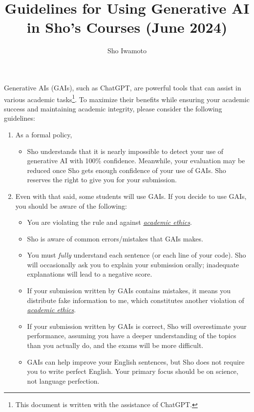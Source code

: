 \documentclass[11pt,pdfa,lastpage,minititle]{MishoNote}
\title{Guidelines for Using Generative AI in Sho's Courses (June 2024)}
\author{Sho Iwamoto}
\begin{document}
\maketitle
Generative AIs (GAIs), such as ChatGPT, are powerful tools that can assist in various academic tasks\footnote{This document is written with the assistance of ChatGPT.}.
To maximize their benefits while ensuring your academic success and maintaining academic integrity, please consider the following guidelines:

\begin{enumerate}
\item As a formal policy, 

\begin{itemize}
  \item Sho understands that it is nearly impossible to detect your use of generative AI with 100\% confidence.
  Meanwhile, your evaluation may be reduced once Sho gets enough confidence of your use of GAIs.
  Sho reserves the right to give you  for your submission.
\end{itemize}
  \item Even with that said, some students will use GAIs. If you decide to use GAIs, you should be aware of the following:
  \begin{itemize}
   \item You are violating the rule and against \href{https://oaa.nsysu.edu.tw/var/file/3/1003/img/1296/acade_rule_27.pdf}{\em academic ethics}.
   \item Sho is aware of common errors/mistakes that GAIs makes.
   \item You must \emph{fully} understand each sentence (or each line of your code). Sho will occasionally ask you to explain your submission orally; inadequate explanations will lead to a negative score.
   \item If your submission written by GAIs contains mistakes, it means you distribute fake information to me, which constitutes another violation of \href{https://oaa.nsysu.edu.tw/var/file/3/1003/img/1296/acade_rule_27.pdf}{\em academic ethics}.
   \item If your submission written by GAIs is correct, Sho will overestimate your performance, assuming you have a deeper understanding of the topics than you actually do, and the exams will be more difficult.
   \item GAIs can help improve your English sentences, but Sho does not require you to write perfect English. Your primary focus should be on science, not language perfection.

\end{itemize}
\end{enumerate}
\end{document}
